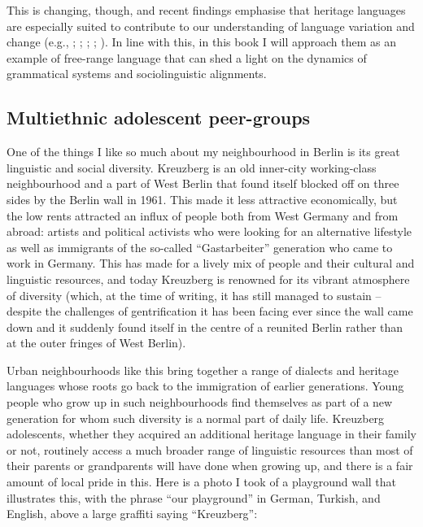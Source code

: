 This is changing, though, and recent findings emphasise that heritage languages are especially suited to contribute to our understanding of language variation and change (e.g., \citealt{Wiese2013}; \citealt{YagerEtal2015}; \citealt{Boas2016}; \citealt{KupischPolinsky2022}; \citealt{WieseEtal2022_continuum}). In line with this, in this book I will approach them as an example of free-range language that can shed a light on the dynamics of grammatical systems and sociolinguistic alignments.

\subsection{Multiethnic adolescent peer-groups}
\hypertarget{Toc125444655}{}
One of the things I like so much about my neighbourhood in Berlin is its great linguistic and social diversity. Kreuzberg is an old inner-city working-class neighbourhood and a part of West Berlin that found itself blocked off on three sides by the Berlin wall in 1961. This made it less attractive economically, but the low rents attracted an influx of people both from West Germany and from abroad: artists and political activists who were looking for an alternative lifestyle as well as immigrants of the so-called “Gastarbeiter” generation who came to work in Germany. This has made for a lively mix of people and their cultural and linguistic resources, and today Kreuzberg is renowned for its vibrant atmosphere of diversity (which, at the time of writing, it has still managed to sustain – despite the challenges of gentrification it has been facing ever since the wall came down and it suddenly found itself in the centre of a reunited Berlin rather than at the outer fringes of West Berlin).

Urban neighbourhoods like this bring together a range of dialects and heritage languages whose roots go back to the immigration of earlier generations. Young people who grow up in such neighbourhoods find themselves as part of a new generation for whom such diversity is a normal part of daily life. Kreuzberg adolescents, whether they acquired an additional heritage language in their family or not, routinely access a much broader range of linguistic resources than most of their parents or grandparents will have done when growing up, and there is a fair amount of local pride in this. Here is a photo I took of a playground wall that illustrates this, with the phrase “our playground” in German, Turkish, and English, above a large graffiti %
saying “Kreuzberg”:

